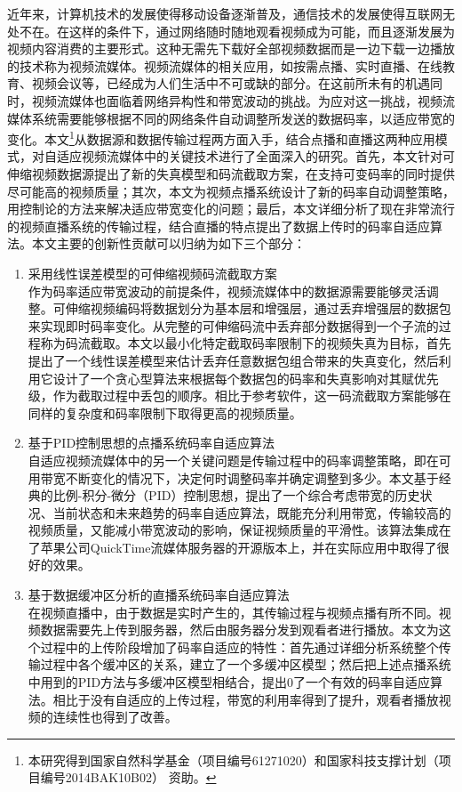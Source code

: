 \begin{cabstract}
近年来，计算机技术的发展使得移动设备逐渐普及，通信技术的发展使得互联网无处不在。在这样的条件下，通过网络随时随地观看视频成为可能，而且逐渐发展为视频内容消费的主要形式。这种无需先下载好全部视频数据而是一边下载一边播放的技术称为视频流媒体。视频流媒体的相关应用，如按需点播、实时直播、在线教育、视频会议等，已经成为人们生活中不可或缺的部分。在这前所未有的机遇同时，视频流媒体也面临着网络异构性和带宽波动的挑战。为应对这一挑战，视频流媒体系统需要能够根据不同的网络条件自动调整所发送的数据码率，以适应带宽的变化。本文\footnote{本研究得到国家自然科学基金（项目编号61271020）和国家科技支撑计划（项目编号2014BAK10B02） 资助。}从数据源和数据传输过程两方面入手，结合点播和直播这两种应用模式，对自适应视频流媒体中的关键技术进行了全面深入的研究。首先，本文针对可伸缩视频数据源提出了新的失真模型和码流截取方案，在支持可变码率的同时提供尽可能高的视频质量；其次，本文为视频点播系统设计了新的码率自动调整策略，用控制论的方法来解决适应带宽变化的问题；最后，本文详细分析了现在非常流行的视频直播系统的传输过程，结合直播的特点提出了数据上传时的码率自适应算法。本文主要的创新性贡献可以归纳为如下三个部分：
\begin{enumerate}
\item {采用线性误差模型的可伸缩视频码流截取方案}\\
作为码率适应带宽波动的前提条件，视频流媒体中的数据源需要能够灵活调整。可伸缩视频编码将数据划分为基本层和增强层，通过丢弃增强层的数据包来实现即时码率变化。从完整的可伸缩码流中丢弃部分数据得到一个子流的过程称为码流截取。本文以最小化特定截取码率限制下的视频失真为目标，首先提出了一个线性误差模型来估计丢弃任意数据包组合带来的失真变化，然后利用它设计了一个贪心型算法来根据每个数据包的码率和失真影响对其赋优先级，作为截取过程中丢包的顺序。相比于参考软件，这一码流截取方案能够在同样的复杂度和码率限制下取得更高的视频质量。
\item {基于PID控制思想的点播系统码率自适应算法}\\
自适应视频流媒体中的另一个关键问题是传输过程中的码率调整策略，即在可用带宽不断变化的情况下，决定何时调整码率并确定调整到多少。本文基于经典的比例-积分-微分（PID）控制思想，提出了一个综合考虑带宽的历史状况、当前状态和未来趋势的码率自适应算法，既能充分利用带宽，传输较高的视频质量，又能减小带宽波动的影响，保证视频质量的平滑性。该算法集成在了苹果公司QuickTime流媒体服务器的开源版本上，并在实际应用中取得了很好的效果。
\item {基于数据缓冲区分析的直播系统码率自适应算法}\\
在视频直播中，由于数据是实时产生的，其传输过程与视频点播有所不同。视频数据需要先上传到服务器，然后由服务器分发到观看者进行播放。本文为这个过程中的上传阶段增加了码率自适应的特性：首先通过详细分析系统整个传输过程中各个缓冲区的关系，建立了一个多缓冲区模型；然后把上述点播系统中用到的PID方法与多缓冲区模型相结合，提出0了一个有效的码率自适应算法。相比于没有自适应的上传过程，带宽的利用率得到了提升，观看者播放视频的连续性也得到了改善。
\end{enumerate}
\end{cabstract}

